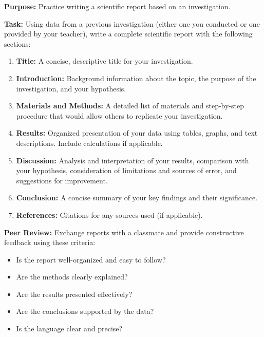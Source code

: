 \documentclass[justified,notoc]{tufte-book}
\newenvironment{investigation}[1]{%
    \begin{tcolorbox}[colback=info!10,colframe=info,title=\textbf{Investigation: #1}]
}{%
    \end{tcolorbox}
}
\begin{document}
\begin{investigation}{Writing a Scientific Report}
\textbf{Purpose:} Practice writing a scientific report based on an investigation.

\textbf{Task:} Using data from a previous investigation (either one you conducted or one provided by your teacher), write a complete scientific report with the following sections:

\begin{enumerate}
    \item \textbf{Title:} A concise, descriptive title for your investigation.
    
    \item \textbf{Introduction:} Background information about the topic, the purpose of the investigation, and your hypothesis.
    
    \item \textbf{Materials and Methods:} A detailed list of materials and step-by-step procedure that would allow others to replicate your investigation.
    
    \item \textbf{Results:} Organized presentation of your data using tables, graphs, and text descriptions. Include calculations if applicable.
    
    \item \textbf{Discussion:} Analysis and interpretation of your results, comparison with your hypothesis, consideration of limitations and sources of error, and suggestions for improvement.
    
    \item \textbf{Conclusion:} A concise summary of your key findings and their significance.
    
    \item \textbf{References:} Citations for any sources used (if applicable).
\end{enumerate}

\textbf{Peer Review:} Exchange reports with a classmate and provide constructive feedback using these criteria:
\begin{itemize}
    \item Is the report well-organized and easy to follow?
    \item Are the methods clearly explained?
    \item Are the results presented effectively?
    \item Are the conclusions supported by the data?
    \item Is the language clear and precise?
\end{itemize}
\end{investigation}
\end{document}
